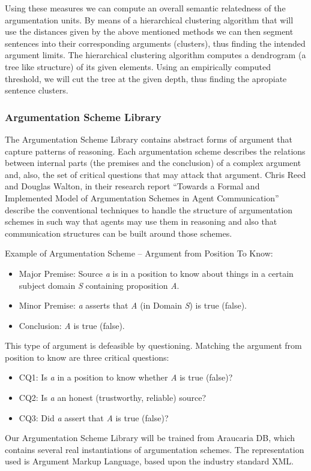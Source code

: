 \par
Using these measures we can compute an overall semantic relatedness of the argumentation units. By means of a hierarchical clustering algorithm that will use the distances given by the above mentioned methods we can then segment sentences
into their corresponding arguments (clusters), thus finding the intended argument limits. The hierarchical clustering algorithm computes a dendrogram (a tree like structure) of its given elements. Using an empirically computed threshold, we will cut
the tree at the given depth, thus finding the apropiate sentence clusters.

\subsubsection {Argumentation Scheme Library}
\par
The Argumentation Scheme Library contains abstract forms of argument that capture patterns of reasoning. Each argumentation scheme describes the relations between internal parts (the premises and the conclusion) of a complex argument and, also, the set of critical questions that may attack that argument. Chris Reed and Douglas Walton\cite{reedwalton}, in their research report ``Towards a Formal and Implemented Model of Argumentation Schemes in Agent Communication'' describe the conventional techniques to handle the structure of argumentation schemes in such way that agents may use them in reasoning and also that communication structures can be built around those schemes.
\par
Example of Argumentation Scheme – Argument from Position To Know:
\begin{itemize}
\item Major Premise: Source \emph{a} is in a position to know about things in a certain subject domain \emph{S} containing proposition \emph{A}.
\item Minor Premise: \emph{a} asserts that \emph{A} (in Domain \emph{S}) is true (false).
\item Conclusion: \emph{A} is true (false).
\end{itemize}

This type of argument is defeasible by questioning. Matching the argument from position to know are three critical questions:
\begin{itemize}
\item CQ1: Is \emph{a} in a position to know whether \emph{A} is true (false)?
\item CQ2: Is \emph{a} an honest (trustworthy, reliable) source?
\item CQ3: Did \emph{a} assert that \emph{A} is true (false)?
\end{itemize}
\par
Our Argumentation Scheme Library will be trained from Araucaria DB, which contains several real instantiations of argumentation schemes. The representation used is Argument Markup Language, based upon the industry standard XML.

